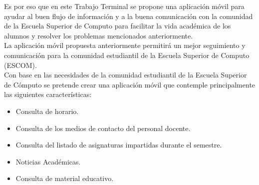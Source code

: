 	Es por eso que en este Trabajo Terminal se propone una aplicación móvil para ayudar al buen flujo de información y a la buena comunicación con la comunidad de la Escuela Superior de Computo para facilitar la vida académica de los alumnos y resolver los problemas mencionados anteriormente.\\
	
	La aplicación móvil propuesta anteriormente permitirá un mejor seguimiento y comunicación para la comunidad estudiantil de la Escuela Superior de Computo (ESCOM).\\
	
	Con base en las necesidades de la comunidad estudiantil de la Escuela Superior de Cómputo se pretende crear una aplicación móvil que contemple principalmente las siguientes características:
	\begin{itemize}
		\item Consulta de horario.
		\item Consulta de los medios de contacto del personal docente.
		\item Consulta del listado de asignaturas impartidas durante el semestre.
		\item Noticias Académicas.
		\item  Consulta de material educativo.
	\end{itemize}
